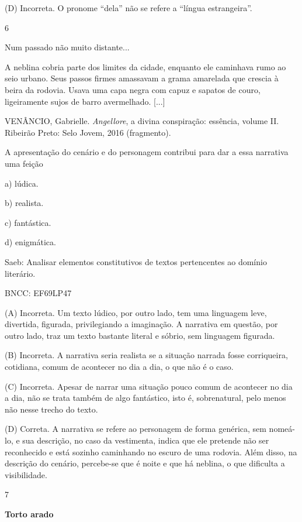 (D) Incorreta. O pronome ``dela'' não se refere a ``língua
estrangeira''.

\num{6}

Num passado não muito distante...

A neblina cobria parte dos limites da cidade, enquanto ele caminhava
rumo ao seio urbano. Seus passos firmes amassavam a grama amarelada que
crescia à beira da rodovia. Usava uma capa negra com capuz e sapatos de
couro, ligeiramente sujos de barro avermelhado. {[}...{]}

VENÂNCIO, Gabrielle. \emph{Angellore}, a divina conspiração: essência,
volume II. Ribeirão Preto: Selo Jovem, 2016 (fragmento).

A apresentação do cenário e do personagem contribui para dar a essa
narrativa uma feição

a) lúdica.

b) realista.

c) fantástica.

d) enigmática.

Saeb: Analisar elementos constitutivos de textos pertencentes ao domínio
literário.

BNCC: EF69LP47

(A) Incorreta. Um texto lúdico, por outro lado, tem uma linguagem leve,
divertida, figurada, privilegiando a imaginação. A narrativa em questão,
por outro lado, traz um texto bastante literal e sóbrio, sem linguagem
figurada.

(B) Incorreta. A narrativa seria realista se a situação narrada fosse
corriqueira, cotidiana, comum de acontecer no dia a dia, o que não é o
caso.

(C) Incorreta. Apesar de narrar uma situação pouco comum de acontecer no
dia a dia, não se trata também de algo fantástico, isto é, sobrenatural,
pelo menos não nesse trecho do texto.

(D) Correta. A narrativa se refere ao personagem de forma genérica, sem
nomeá-lo, e sua descrição, no caso da vestimenta, indica que ele
pretende não ser reconhecido e está sozinho caminhando no escuro de uma
rodovia. Além disso, na descrição do cenário, percebe-se que é noite e
que há neblina, o que dificulta a visibilidade.

\num{7}

\textbf{Torto arado}

